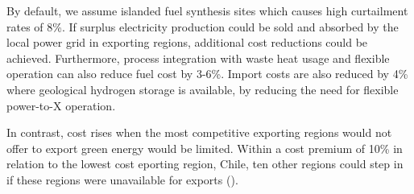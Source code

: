 By default, we assume islanded fuel synthesis sites which causes high
curtailment rates of 8\%. If surplus electricity production could be sold and
absorbed by the local power grid in exporting regions, additional cost
reductions could be achieved. Furthermore, process integration with waste heat
usage and flexible operation can also reduce fuel cost by 3-6\%. Import costs
are also reduced by 4\% where geological hydrogen storage is available, by
reducing the need for flexible \mbox{power-to-X} operation.

In contrast, cost rises when the most competitive exporting regions would not
offer to export green energy would be limited. Within a cost premium of 10\% in
relation to the lowest cost eporting region, Chile, ten other regions could
step in if these regions were unavailable for exports
().
